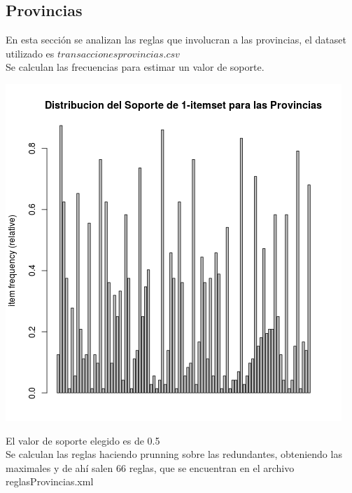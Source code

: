 \documentclass{endm}
\begin{document}
\subsection{Provincias} 

En esta sección se analizan las reglas que involucran a las provincias, el dataset utilizado es $transacciones provincias.csv$ \\

Se calculan las frecuencias para estimar un valor de soporte. \\

\begin{center}
\includegraphics[scale=0.3]{graficos/soportesProvincias.png}
\end{center}

El valor de soporte elegido es de 0.5\\

Se calculan las reglas haciendo prunning sobre las redundantes, obteniendo las maximales y de ahí salen 66 reglas, que se encuentran en el archivo reglasProvincias.xml \\
\end{document}
